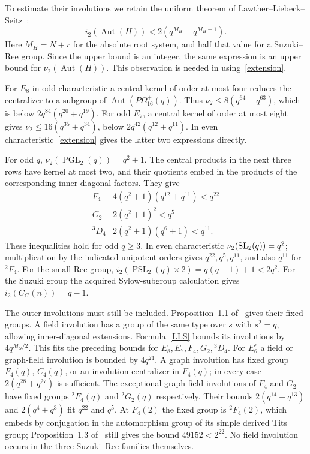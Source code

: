 \documentclass[10pt,a4paper]{article}
\newcommand{\Aut}{\operatorname{Aut}}
\newcommand{\PSL}{\operatorname{PSL}}\newcommand{\PGL}{\operatorname{PGL}}
\newcommand{\nuu}{\nu_2}
\begin{document}
To estimate their involutions we retain the uniform theorem of
Lawther--Liebeck--Seitz~\cite[Proposition~1.3]{LLS}:
\begin{equation}\label{LLS}
 i_2(\Aut(H))<2(q^{M_H}+q^{M_H-1}).
\end{equation}
Here $M_H=N+r$ for the absolute root system, and half that value for a
Suzuki--Ree group. Since the upper bound is an integer, the same expression
is an upper bound for $\nuu(\Aut(H))$. This observation is needed in
using~\eqref{extension}.

For $E_8$ in odd characteristic a central kernel of order at most four
reduces the centralizer to a subgroup of $\Aut(P\Omega_{16}^+(q))$.
Thus $\nuu\le8(q^{64}+q^{63})$, which is below
$2q^{84}(q^{20}+q^{19})$. For odd $E_7$, a central kernel of order at most
eight gives $\nuu\le16(q^{35}+q^{34})$, below
$2q^{42}(q^{12}+q^{11})$. In even characteristic~\eqref{extension}
gives the latter two expressions directly.

For odd $q$, $\nuu(\PGL_2(q))=q^2+1$. The central products in the next
three rows have kernel at most two, and their quotients embed in the
products of the corresponding inner-diagonal factors. They give
\[
\begin{array}{c|c}
F_4&4(q^2+1)(q^{12}+q^{11})<q^{22}\\
G_2&2(q^2+1)^2<q^5\\
{}^3D_4&2(q^2+1)(q^6+1)<q^{11}.
\end{array}
\]
These inequalities hold for odd $q\ge3$. In even characteristic
$\nuu(\SL_2(q))=q^2$; multiplication by the indicated unipotent orders
gives $q^{22},q^5,q^{11}$, and also $q^{11}$ for ${}^2F_4$.
For the small Ree group,
$i_2(\PSL_2(q)\times2)=q(q-1)+1<2q^2$.
For the Suzuki group the acquired Sylow-subgroup calculation gives
$i_2(C_G(n))=q-1$.

The outer involutions must still be included. Proposition~1.1 of~\cite{LLS}
gives their fixed groups. A field involution has a group of the same
type over $s$ with $s^2=q$, allowing inner-diagonal extensions.
Formula~\eqref{LLS} bounds its involutions by $4q^{M_G/2}$.
This fits the preceding bounds for $E_8,E_7,F_4,G_2,{}^3D_4$.
For $E_6^\epsilon$ a field or graph-field involution is bounded by
$4q^{21}$. A graph involution has fixed group $F_4(q)$, $C_4(q)$,
or an involution centralizer in $F_4(q)$; in every case
$2(q^{28}+q^{27})$ is sufficient.
The exceptional graph-field involutions of $F_4$ and $G_2$ have fixed
groups ${}^2F_4(q)$ and ${}^2G_2(q)$ respectively. Their bounds
$2(q^{14}+q^{13})$ and $2(q^4+q^3)$ fit $q^{22}$ and $q^5$.
At $F_4(2)$ the fixed group is ${}^2F_4(2)$, which embeds by conjugation
in the automorphism group of its simple derived Tits group;
Proposition~1.3 of~\cite{LLS} still gives the bound $49152<2^{22}$.
No field involution occurs in the three Suzuki--Ree families themselves.
\end{document}
